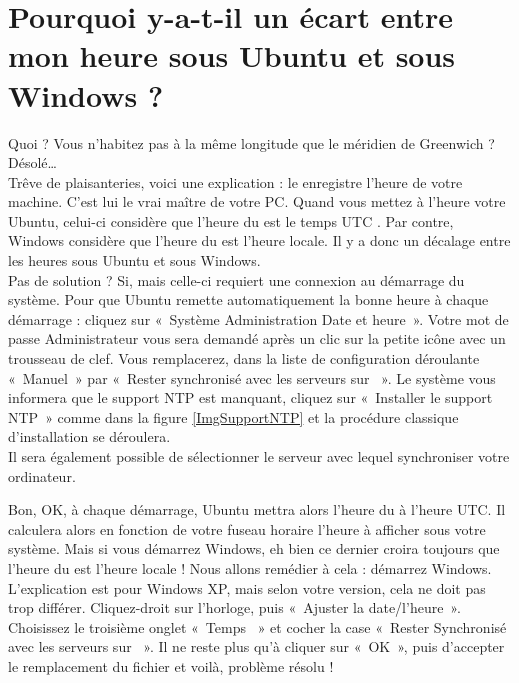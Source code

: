 \section{Pourquoi y-a-t-il un écart entre mon heure sous Ubuntu et sous Windows ?}
\label{RefHeureNTP}
Quoi ? Vous n'habitez pas à la même longitude que le méridien de Greenwich ? Désolé\ldots{}\\
Trêve de plaisanteries, voici une explication : le  enregistre l'heure de votre machine. C'est lui le vrai maître de votre PC. Quand vous mettez à l'heure votre Ubuntu, celui-ci considère que l'heure du  est le temps UTC . Par contre, Windows considère que l'heure du  est l'heure locale. Il y a donc un décalage entre les heures sous Ubuntu et sous Windows.\\Pas de solution ? Si, mais celle-ci requiert une connexion  au démarrage du système. Pour que Ubuntu remette automatiquement la bonne heure à chaque démarrage : cliquez sur «~Système \FlecheDroite Administration \FlecheDroite Date et heure~». Votre mot de passe Administrateur vous sera demandé après un clic sur la petite icône avec un trousseau de clef. Vous remplacerez, dans la liste de configuration déroulante «~Manuel~» par «~Rester synchronisé avec les serveurs sur ~». Le système vous informera que le support NTP est manquant, cliquez sur «~Installer le support NTP~» comme dans la figure \ref{ImgSupportNTP} et la procédure classique d'installation se déroulera.\\
Il sera également possible de sélectionner le serveur avec lequel synchroniser votre ordinateur.\par
{}
Bon, OK, à chaque démarrage, Ubuntu mettra alors l'heure du  à l'heure UTC. Il calculera alors en fonction de votre fuseau horaire l'heure à afficher sous votre système. Mais si vous démarrez Windows, eh bien ce dernier croira toujours que l'heure du  est l'heure locale ! Nous allons remédier à cela : démarrez Windows. L'explication est pour Windows XP, mais selon votre version, cela ne doit pas trop différer. Cliquez-droit sur l'horloge, puis «~Ajuster la date/l'heure~». Choisissez le troisième onglet «~Temps ~» et cocher la case «~Rester Synchronisé avec les serveurs sur ~». Il ne reste plus qu'à cliquer sur «~OK~», puis d'accepter le remplacement du fichier  et voilà, problème résolu !
